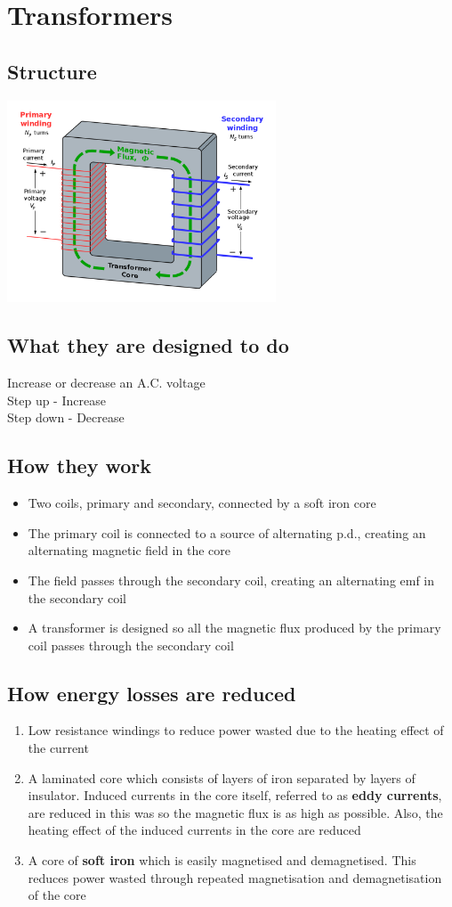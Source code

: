 \documentclass{article}[18pt]
\begin{document}
\section{Transformers}
\subsection{Structure}
\begin{center}
\includegraphics[width=8cm] {transformer.png}  
\end{center}
\subsection{What they are designed to do}
Increase or decrease an A.C. voltage\\
Step up - Increase\\
Step down - Decrease
\subsection{How they work}
\begin{itemize}
\item Two coils, primary and secondary, connected by a soft iron core
\item The primary coil is connected to a source of alternating p.d., creating an alternating magnetic field in the core
\item The field passes through the secondary coil, creating an alternating emf in the secondary coil
\item A transformer is designed so all the magnetic flux produced by the primary coil passes through the secondary coil
\end{itemize}
\subsection{How energy losses are reduced}
\begin{enumerate}
\item Low resistance windings to reduce power wasted due to the heating effect of the current
\item A laminated core which consists of layers of iron separated by layers of insulator. Induced currents in the core itself, referred to as \textbf{eddy currents}, are reduced in this was so the magnetic flux is as high as possible. Also, the heating effect of the induced currents in the core are reduced
\item A core of \textbf{soft iron} which is easily magnetised and demagnetised. This reduces power wasted through repeated magnetisation and demagnetisation of the core
\end{enumerate}  
\end{document}
